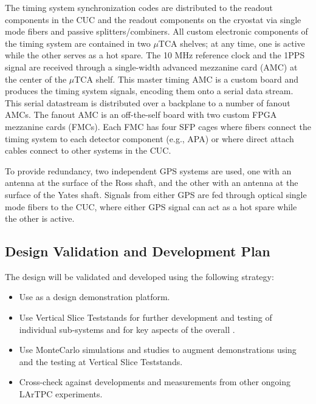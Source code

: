 The timing system synchronization codes are distributed to the 
readout components in the CUC and the readout components on the
cryostat via single mode fibers and passive splitters/combiners. All
custom electronic components of the timing system are contained in two
$\mu$TCA shelves; at any time, one is active while the other serves as
a hot spare. The 10 MHz reference clock and the 1PPS signal
are received through a single-width advanced mezzanine card (AMC) at the
center of the $\mu$TCA shelf. This master timing AMC is a custom board
and produces the timing system signals, encoding them onto
a serial data stream. This serial datastream  is distributed over a backplane to 
a number of fanout AMCs. The fanout AMC is an off-the-self board
with two custom FPGA mezzanine cards (FMCs). Each FMC has four SFP
cages where fibers connect the timing system to each detector
component (e.g., APA) or where direct attach cables connect
to other systems in the CUC.

To provide redundancy, two independent GPS systems are used,
one with an antenna at the surface of the Ross shaft, and the other
with an antenna at the surface of the Yates shaft. Signals from either
GPS are fed through optical single mode fibers to the CUC, where
either GPS signal can act as a hot spare while the other is active. 

\subsection{Design Validation and Development Plan}
\label{sec:sp-daq:design-validation}

The    design will be validated and developed using the following strategy:
\begin{itemize}
\item Use  as a design demonstration platform. 
\item Use Vertical Slice Teststands for further development and testing of
  individual  sub-systems and for key aspects of the
  overall . 
\item Use  MonteCarlo simulations and studies to augment
  demonstrations using  and the testing at Vertical Slice Teststands.
\item Cross-check against developments and measurements from other ongoing
  LArTPC experiments.
\end{itemize}

